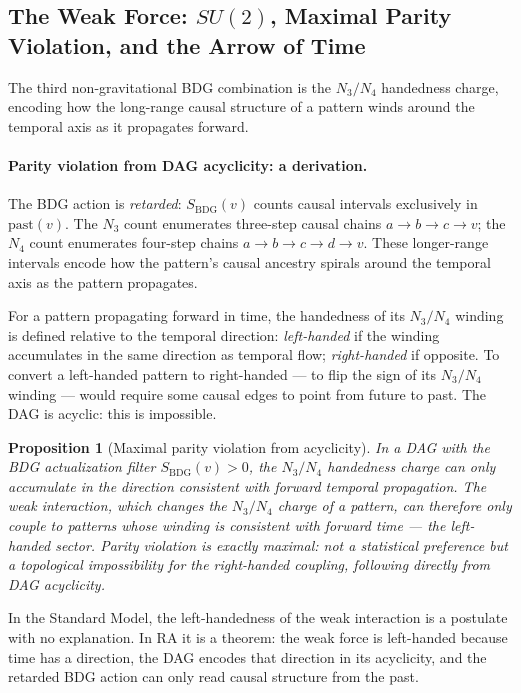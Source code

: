 \documentclass[11pt,a4paper]{article}
\newtheorem{proposition}[theorem]{Proposition}
\newcommand{\SBDG}{S_{\mathrm{BDG}}}
\begin{document}
\subsection{The Weak Force: $SU(2)$, Maximal Parity Violation, and the Arrow of Time}

The third non-gravitational BDG combination is the $N_3/N_4$ handedness
charge, encoding how the long-range causal structure of a pattern winds
around the temporal axis as it propagates forward.

\paragraph{Parity violation from DAG acyclicity: a derivation.}
The BDG action is \emph{retarded}: $\SBDG(v)$ counts causal intervals
exclusively in $\mathrm{past}(v)$. The $N_3$ count enumerates three-step
causal chains $a \to b \to c \to v$; the $N_4$ count enumerates four-step
chains $a \to b \to c \to d \to v$. These longer-range intervals encode how
the pattern's causal ancestry spirals around the temporal axis as the pattern
propagates.

For a pattern propagating forward in time, the handedness of its $N_3/N_4$
winding is defined relative to the temporal direction: \emph{left-handed} if
the winding accumulates in the same direction as temporal flow;
\emph{right-handed} if opposite. To convert a left-handed pattern to
right-handed --- to flip the sign of its $N_3/N_4$ winding --- would require
some causal edges to point from future to past. The DAG is acyclic: this is
impossible.

\begin{proposition}[Maximal parity violation from acyclicity]
\label{prop:chirality}
In a DAG with the BDG actualization filter $\SBDG(v) > 0$, the $N_3/N_4$
handedness charge can only accumulate in the direction consistent with forward
temporal propagation. The weak interaction, which changes the $N_3/N_4$
charge of a pattern, can therefore only couple to patterns whose winding is
consistent with forward time --- the left-handed sector. Parity violation is
exactly maximal: not a statistical preference but a topological impossibility
for the right-handed coupling, following directly from DAG acyclicity.
\end{proposition}

In the Standard Model, the left-handedness of the weak interaction is a
postulate with no explanation. In RA it is a theorem: the weak force is
left-handed because time has a direction, the DAG encodes that direction
in its acyclicity, and the retarded BDG action can only read causal structure
from the past.
\end{document}
